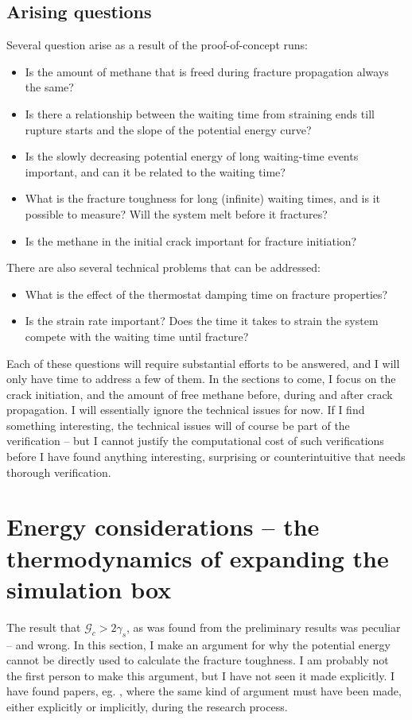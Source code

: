 \subsection{Arising questions}
Several question arise as a result of the proof-of-concept runs:
\begin{itemize}
\item Is the amount of methane that is freed during fracture propagation always the same?
\item Is there a relationship between the waiting time from straining ends till rupture starts and the slope of the potential energy curve?
\item Is the slowly decreasing potential energy of long waiting-time events important, and can it be related to the waiting time?
\item What is the fracture toughness for long (infinite) waiting times, and is it possible to measure? Will the system melt before it fractures?
\item Is the methane in the initial crack important for fracture initiation?
\end{itemize}

There are also several technical problems that can be addressed:
\begin{itemize}
\item What is the effect of the thermostat damping time on fracture properties?
\item Is the strain rate important? Does the time it takes to strain the system compete with the waiting time until fracture?
\end{itemize}

Each of these questions will require substantial efforts to be answered, and I will only have time to address a few of them. In the sections to come, I focus on the crack initiation, and the amount of free methane before, during and after crack propagation. I will essentially ignore the technical issues for now. If I find something interesting, the technical issues will of course be part of the verification -- but I cannot justify the computational cost of such verifications before I have found anything interesting, surprising or counterintuitive that needs thorough verification.

\section{Energy considerations -- the thermodynamics of expanding the simulation box}
\label{sec:energy_considerations}
The result that $\mathcal{G}_c > 2\gamma_s$, as was found from the preliminary results was peculiar -- and wrong. In this section, I make an argument for why the potential energy cannot be directly used to calculate the fracture toughness. I am probably not the first person to make this argument, but I have not seen it made explicitly. I have found papers, eg. \citet{Hantal2014}, where the same kind of argument must have been made, either explicitly or implicitly, during the research process. 

